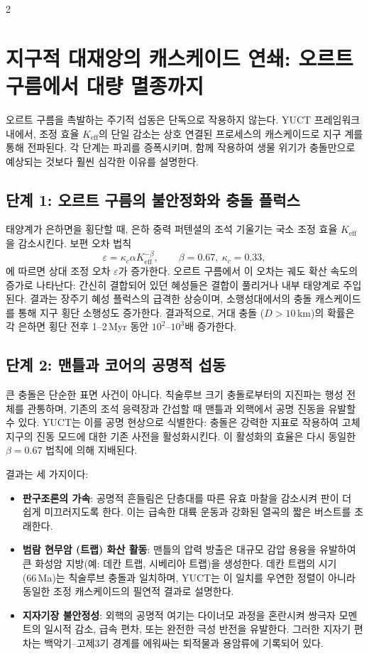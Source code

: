 \documentclass[12pt,a4paper]{article}
\begin{document}
	\begin{multicols}{2}
		
		\section{지구적 대재앙의 캐스케이드 연쇄: 오르트 구름에서 대량 멸종까지}
		오르트 구름을 촉발하는 주기적 섭동은 단독으로 작용하지 않는다. YUCT 프레임워크 내에서, 조정 효율 \(K_{\mathrm{eff}}\)의 단일 감소는 상호 연결된 프로세스의 캐스케이드로 지구 계를 통해 전파된다. 각 단계는 파괴를 증폭시키며, 함께 작용하여 생물 위기가 충돌만으로 예상되는 것보다 훨씬 심각한 이유를 설명한다.
		
		\subsection{단계 1: 오르트 구름의 불안정화와 충돌 플럭스}
		태양계가 은하면을 횡단할 때, 은하 중력 퍼텐셜의 조석 기울기는 국소 조정 효율 \(K_{\mathrm{eff}}\)을 감소시킨다. 보편 오차 법칙
		\begin{equation}
			\varepsilon = \kappa_c \alpha K_{\mathrm{eff}}^{-\beta},\qquad \beta=0.67,\ \kappa_c=0.33,
		\end{equation}
		에 따르면 상대 조정 오차 \(\varepsilon\)가 증가한다. 오르트 구름에서 이 오차는 궤도 확산 속도의 증가로 나타난다: 간신히 결합되어 있던 혜성들은 결합이 풀리거나 내부 태양계로 주입된다. 결과는 장주기 혜성 플럭스의 급격한 상승이며, 소행성대에서의 충돌 캐스케이드를 통해 지구 횡단 소행성도 증가한다. 결과적으로, 거대 충돌 (\(D>10\) km)의 확률은 각 은하면 횡단 전후 1–2 Myr 동안 \(10^2\)–\(10^3\)배 증가한다.
		
		\subsection{단계 2: 맨틀과 코어의 공명적 섭동}
		큰 충돌은 단순한 표면 사건이 아니다. 칙술루브 크기 충돌로부터의 지진파는 행성 전체를 관통하며, 기존의 조석 응력장과 간섭할 때 맨틀과 외핵에서 공명 진동을 유발할 수 있다. YUCT는 이를 공명 현상으로 식별한다: 충돌은 강력한 지표로 작용하여 고체 지구의 진동 모드에 대한 기존 사전을 활성화시킨다. 이 활성화의 효율은 다시 동일한 \(\beta = 0.67\) 법칙에 의해 지배된다.
		
		결과는 세 가지이다:
		\begin{itemize}
			\item \textbf{판구조론의 가속}: 공명적 흔들림은 단층대를 따른 유효 마찰을 감소시켜 판이 더 쉽게 미끄러지도록 한다. 이는 급속한 대륙 운동과 강화된 열곡의 짧은 버스트를 초래한다.
			\item \textbf{범람 현무암 (트랩) 화산 활동}: 맨틀의 압력 방출은 대규모 감압 용융을 유발하여 큰 화성암 지방(예: 데칸 트랩, 시베리아 트랩)을 생성한다. 데칸 트랩의 시기(66 Ma)는 칙술루브 충돌과 일치하며, YUCT는 이 일치를 우연한 정렬이 아니라 동일한 조정 캐스케이드의 필연적 결과로 설명한다.
			\item \textbf{지자기장 불안정성}: 외핵의 공명적 여기는 다이너모 과정을 혼란시켜 쌍극자 모멘트의 일시적 감소, 급속 편차, 또는 완전한 극성 반전을 유발한다. 그러한 지자기 편차는 백악기–고제3기 경계를 에워싸는 퇴적물과 용암류에 기록되어 있다.
		\end{itemize}
		

\end{multicols}
\end{document}
